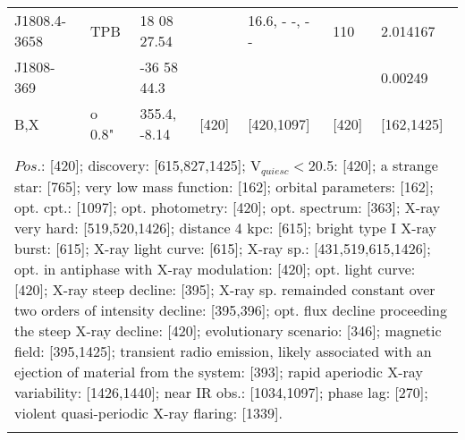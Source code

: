 \documentclass{aa}
\begin{document}
\begin{tabular}{p{2.5cm}p{1cm}p{1.8cm}p{2.3cm}p{3.3cm}p{2.0cm}p{2.2cm}}
\noalign{\smallskip}
J1808.4-3658     & TPB    & 18 08 27.54  &                  & 16.6, - -, - -         & 110               & 2.014167  \\
J1808-369           &             & -36 58 44.3   &                   &                             &                       & 0.00249    \\
B,X                       & o 0.8"  & 355.4, -8.14  & [420]        & [420,1097]         & [420]             & [162,1425]  \\
\\
\multicolumn{7}{p{17.5cm}}{
$Pos$.: [420]; discovery: [615,827,1425]; V$_{quiesc}<$20.5: [420]; a strange star: [765]; very low mass 
function: [162]; orbital parameters: [162]; opt. cpt.: [1097]; opt. photometry: [420]; opt. spectrum: [363]; 
X-ray very hard: [519,520,1426]; distance 4 kpc: [615]; bright type I X-ray burst: [615]; X-ray light curve: [615]; 
X-ray sp.: [431,519,615,1426]; opt. in antiphase with X-ray modulation: [420]; opt. light curve: [420]; X-ray steep 
decline: [395]; X-ray sp. remainded constant over two orders of intensity decline: [395,396]; opt. flux decline 
proceeding the steep X-ray decline: [420]; evolutionary scenario: [346]; magnetic field: [395,1425]; transient 
radio emission, likely associated with an ejection of material from the system: [393]; rapid aperiodic X-ray 
variability: [1426,1440]; near IR obs.: [1034,1097]; phase lag: [270]; violent quasi-periodic X-ray flaring: [1339].}\\
\noalign{\smallskip}
\hline

\end{tabular}
\end{document}
